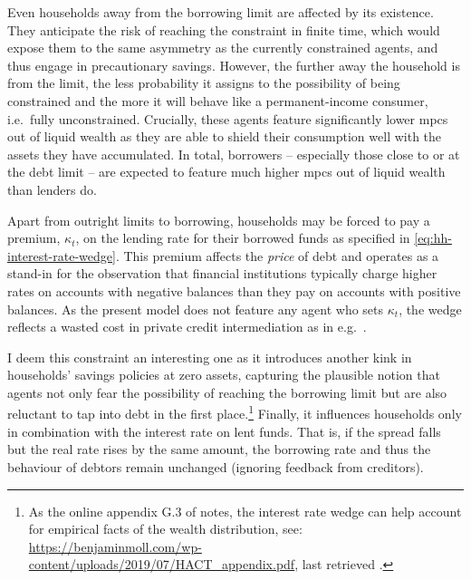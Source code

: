 \documentclass[a4paper,12pt]{article} %
\numberwithin{equation}{section} %
\numberwithin{figure}{section}
\numberwithin{table}{section}
\begin{document}
Even households away from the borrowing limit are affected by its existence. They anticipate the risk of reaching the constraint in finite time, which would expose them to the same asymmetry as the currently constrained agents, and thus engage in precautionary savings. However, the further away the household is from the limit, the less probability it assigns to the possibility of being constrained and the more it will behave like a permanent-income consumer, i.e.~fully unconstrained. Crucially, these agents feature significantly lower \Gls{mpc}s out of liquid wealth as they are able to shield their consumption well with the assets they have accumulated. In total, borrowers -- especially those close to or at the debt limit -- are expected to feature much higher \Gls{mpc}s out of liquid wealth than lenders do.

Apart from outright limits to borrowing, households may be forced to pay a premium, $\kappa_t$, on the lending rate for their borrowed funds as specified in \eqref{eq:hh-interest-rate-wedge}. This premium affects the \textit{price} of debt and operates as a stand-in for the observation that financial institutions typically charge higher rates on accounts with negative balances than they pay on accounts with positive balances. As the present model does not feature any agent who sets $\kappa_t$, the wedge reflects a wasted cost in private credit intermediation as in e.g.~\textcite{bayer2023}.

I deem this constraint an interesting one as it introduces another kink in households' savings policies at zero assets, capturing the plausible notion that agents not only fear the possibility of reaching the borrowing limit but are also reluctant to tap into debt in the first place.\footnote{As the online appendix G.3 of \textcite{achdou2022} notes, the interest rate wedge can help account for empirical facts of the wealth distribution, see: \url{https://benjaminmoll.com/wp-content/uploads/2019/07/HACT_appendix.pdf}, last retrieved .} Finally, it influences households only in combination with the interest rate on lent funds. That is, if the spread falls but the real rate rises by the same amount, the borrowing rate and thus the behaviour of debtors remain unchanged (ignoring feedback from creditors).
\end{document}
